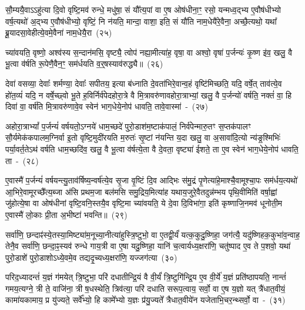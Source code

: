 सौ॒म्ययै॒वा\-ऽऽ\-हु॑त्या दि॒वो वृष्टि॒मव॑ रुन्धे॒ मधु॑षा॒ सं यौ᳚त्य॒पां वा ए॒ष ओष॑धीना॒ꣳ॒ रसो॒ यन्मध्व॒द्भ्य ए॒वौष॑धीभ्यो वर्\mbox{}ष॒त्यथो॑ अ॒द्भ्य ए॒वौष॑धीभ्यो॒ वृष्टिं॒ नि न॑यति॒ मान्दा॒ वाशा॒ इति॒ सं यौ॑ति नाम॒धेयै॑रे॒वैना॒ अच्छै॒त्यथो॒ यथा᳚ ब्रू॒यादसा॒वेहीत्ये॒वमे॒वैना॑ नाम॒धेयै॒रा~(२५)\ip

च्या॑वयति॒ वृष्णो॒ अश्व॑स्य स॒न्दान॑मसि॒ वृष्ट्यै॒ त्वोप॑ नह्या॒मीत्या॑ह॒ वृषा॒ वा अश्वो॒ वृषा॑ प॒र्जन्यः॑ कृ॒ष्ण इ॑व॒ खलु॒ वै भू॒त्वा व॑र्\mbox{}षति रू॒पेणै॒वैन॒ꣳ॒ सम॑र्धयति व॒र्॒\mbox{}षस्याव॑रुद्ध्यै॥~(२६)\ip

{\anuvakamend[{अ॒ष्टौ भव॑न्ति नाम॒धेयै॒रैका॒न्नत्रि॒ꣳ॒शच्च॑}]}

देवा॑ वसव्या॒ देवाः᳚ शर्मण्या॒ देवाः᳚ सपीतय॒ इत्या ब॑ध्नाति दे॒वता॑भिरे॒वान्व॒हं वृष्टि॑मिच्छति॒ यदि॒ वर्\mbox{}षे॒त् ताव॑त्ये॒व हो॑त॒व्यं॑ यदि॒ न वर्\mbox{}षे॒च्छ्वो भू॒ते ह॒विर्निर्व॑पेदहोरा॒त्रे वै मि॒त्रावरु॑णावहोरा॒त्राभ्यां॒ खलु॒ वै प॒र्जन्यो॑ वर्\mbox{}षति॒ नक्तं॑ वा॒ हि दिवा॑ वा॒ वर्\mbox{}ष॑ति मि॒त्रावरु॑णावे॒व स्वेन॑ भाग॒\-धेये॒नोप॑ धावति॒ तावे॒वास्मा॑~-~(२७)\ip

अहोरा॒त्रा\-भ्यां᳚ प॒र्जन्यं॑ वर्\mbox{}षयतो॒\-ऽग्नये॑ धाम॒च्छदे॑ पुरो॒डाश॑\-म॒ष्टा\-क॑पालं॒ निर्व॑पेन्मारु॒तꣳ स॒प्तक॑पालꣳ सौ॒र्यमेक॑कपालम॒ग्निर्वा इ॒तो वृष्टि॒मुदी॑रयति म॒रुतः॑ सृ॒ष्टां न॑यन्ति य॒दा खलु॒ वा अ॒सावा॑दि॒त्यो न्य॑ङ्र॒श्मिभिः॑ पर्या॒वर्त॒ते\-ऽथ॑ वर्\mbox{}षति धाम॒च्छदि॑व॒ खलु॒ वै भू॒त्वा व॑र्\mbox{}षत्ये॒ता वै दे॒वता॒ वृष्ट्या॑ ईशते॒ ता ए॒व स्वेन॑ भाग॒\-धेये॒नोप॑ धावति॒ ता~-~(२८)\ip

ए॒वास्मै॑ प॒र्जन्यं॑ वर्\mbox{}षयन्त्यु॒ताव॑र्\mbox{}षिष्य॒न्वर्\mbox{}ष॑त्ये॒व सृ॒जा वृ॒ष्टिं दि॒व आद्भिः स॑मु॒द्रं पृ॒णेत्या॑हे॒माश्चै॒वामूश्चा॒पः सम॑र्धय॒त्यथो॑ आ॒भिरे॒वामूरच्छै᳚त्य॒ब्जा अ॑सि प्रथम॒जा बल॑मसि समु॒द्रिय॒मित्या॑ह यथाय॒जुरे॒वैतदुन्न॑म्भय पृथि॒वीमिति॑ वर्\mbox{}षा॒ह्वां जु॑होत्ये॒षा वा ओष॑धीनां वृष्टि॒वनि॒स्तयै॒व वृष्टि॒मा च्या॑वयति॒ ये दे॒वा दि॒विभा॑गा॒ इति॑ कृष्णाजि॒नमव॑ धूनोती॒म ए॒वास्मै॑ लो॒काः प्री॒ता अ॒भीष्टा॑ भवन्ति॥~(२९)\ip

{\anuvakamend[{अ॒स्मै॒ धा॒व॒ति॒ ता वा एक॑विꣳशतिश्च}]}%

सर्वा॑णि॒ छन्दाꣴ॑स्ये॒तस्या॒मिष्ट्या॑म॒नूच्या॒नीत्या॑हुस्त्रि॒ष्टुभो॒ वा ए॒तद्वी॒र्यं॑ यत्क॒कुदु॒ष्णिहा॒ जग॑त्यै॒ यदु॑ष्णिहक॒कुभा॑व॒न्वाह॒ तेनै॒व सर्वा॑णि॒ छन्दा॒ꣴ॒स्यव॑ रुन्धे गाय॒त्री वा ए॒षा यदु॒ष्णिहा॒ यानि॑ च॒त्वार्यध्य॒क्षरा॑णि॒ चतु॑ष्पाद ए॒व ते प॒शवो॒ यथा॑ पुरो॒डाशे॑ पुरो॒डाशो\-ऽध्ये॒वमे॒व तद्यदृ॒च्यध्य॒क्षरा॑णि॒ यज्जग॑त्या~(३०)\ip

परिद॒ध्यादन्तं॑ य॒ज्ञं ग॑मयेत् त्रि॒ष्टुभा॒ परि॑ दधातीन्द्रि॒यं वै वी॒र्यं॑ त्रि॒ष्टुगि॑न्द्रि॒य ए॒व वी॒र्ये॑ य॒ज्ञं प्रति॑\-ष्ठापयति॒ नान्तं॑ गमय॒त्यग्ने॒ त्री ते॒ वाजि॑ना॒ त्री ष॒धस्थेति॒ त्रिव॑त्या॒ परि॑ दधाति सरूप॒त्वाय॒ सर्वो॒ वा ए॒ष य॒ज्ञो यत् त्रै॑धात॒वीयं॒ कामा॑यकामाय॒ प्र यु॑ज्यते॒ सर्वे᳚भ्यो॒ हि कामे᳚भ्यो य॒ज्ञः प्र॑यु॒ज्यते᳚ त्रैधात॒वीये॑न यजेताभि॒चर॒न्थ्सर्वो॒ \mbox{वा~-~(३१)\ip}

